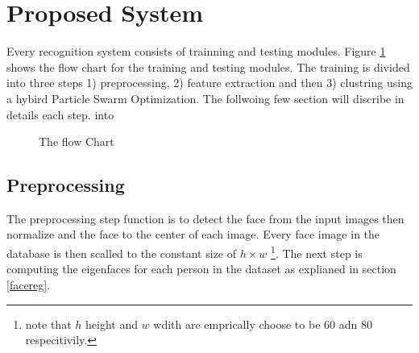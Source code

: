 \documentclass[a4paper,twoside]{article}
\begin{document}
\section{Proposed System}
\label{sec:proposed}

Every recognition system consists of trainning and testing modules. Figure
\ref{Blockchart} shows the flow chart for the training and testing modules.
The training is divided into three steps 1) preprocessing, 2) feature extraction
and then 3) clustring using a hybird Particle Swarm Optimization. The follwoing
few section will discribe in details each step.  %
into




\begin{figure}
 \begin{center}
 \centering

\caption{ The flow Chart}
\label{Blockchart}
 \end{center}\end{figure}
\subsection{Preprocessing}
The preprocessing step function is to detect the face from the input images
then normalize and the face to the center of each  image.  Every face
image in the database is  then scalled to the constant size of $h \times w$
\footnote{ note that  $h$ height and $w$ wdith are emprically choose to be 60
adn 80 respecitivily.}. The next step is computing the eigenfaces for each
person in the dataset as explianed in section \ref{facereg}.
\end{document}
